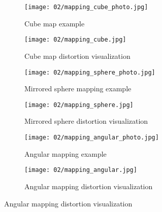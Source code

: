 \begin{figure}
\centering
    \hfill
    \begin{subfigure}[t]{0.5\textwidth}            
            \centering
            \texttt{[image: 02/mapping\_cube\_photo.jpg]}
            \caption{Cube map example}\label{fig:cubemap-intro}
    \end{subfigure}%
    \hfill
    \begin{subfigure}[t]{0.5\textwidth}
            \centering
            \texttt{[image: 02/mapping\_cube.jpg]}
            \caption{Cube map distortion visualization}\label{fig:cubemap-distortion}
  
    \end{subfigure}
    \hfill
    \par\bigskip %

    \hfill
    \begin{subfigure}[t]{0.5\textwidth}
            \centering
            \texttt{[image: 02/mapping\_sphere\_photo.jpg]}
            \caption{Mirrored sphere mapping example}
            \label{fig:sphere-intro}
    \end{subfigure}%
    \hfill
    \begin{subfigure}[t]{0.5\textwidth}
            \centering
            \texttt{[image: 02/mapping\_sphere.jpg]}
            \caption{Mirrored sphere distortion visualization}
            \label{fig:sphere-distortion}
    \end{subfigure}
    \hfill
    \par\bigskip %

    \hfill
    \begin{subfigure}[t]{0.5\textwidth}            
            \centering
            \texttt{[image: 02/mapping\_angular\_photo.jpg]}
            \caption{Angular mapping example}
            \label{fig:angular-intro}
    \end{subfigure}%
    \hfill
    \begin{subfigure}[t]{0.5\textwidth}
            \centering
            \texttt{[image: 02/mapping\_angular.jpg]}
            \caption{Angular mapping distortion visualization}
            \label{fig:angular-distortion}
    \end{subfigure}
    \hfill
    \par\bigskip %


\end{figure}
